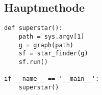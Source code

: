 \documentclass[a4paper,10pt,ngerman]{scrartcl}
\begin{document}
\subsection{Hauptmethode}
\begin{lstlisting}[frame=single]
def superstar():             
    path = sys.argv[1]          
    g = graph(path)             
    sf = star_finder(g)        
    sf.run()                  

if __name__ == '__main__':
    superstar()                                            

 
\end{lstlisting}
\end{document}
